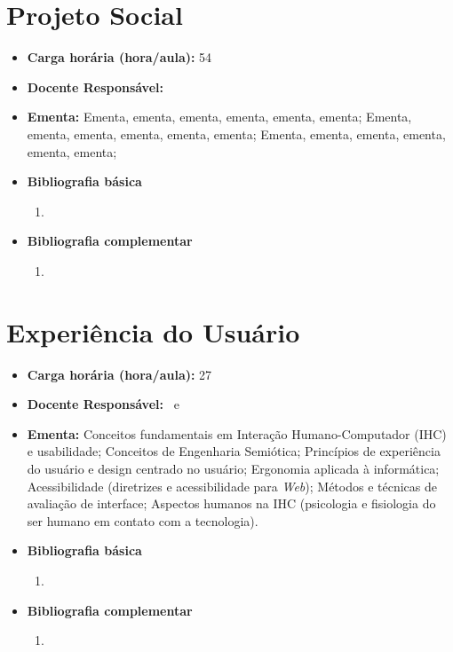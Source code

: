 \documentclass[11pt,fleqn]{book} %
\begin{document}

\newpage
\section{Projeto Social}\label{disc:projamb}

\begin{itemize}
	\item \textbf{Carga horária (hora/aula):} 54
	\item \textbf{Docente Responsável:}~
	\item \textbf{Ementa:} 
	Ementa, ementa, ementa, ementa, ementa, ementa;
	Ementa, ementa, ementa, ementa, ementa, ementa;
	Ementa, ementa, ementa, ementa, ementa, ementa;	
	\item \textbf{Bibliografia básica}
	\begin{enumerate}
		\item 
	\end{enumerate}
	\item \textbf{Bibliografia complementar}
	\begin{enumerate}
		\item 	
	\end{enumerate}	
\end{itemize}

\newpage
\section{Experiência do Usuário}\label{disc:expuser}

\begin{itemize}
	\item \textbf{Carga horária (hora/aula):} 27
	\item \textbf{Docente Responsável:}~ e ~
	\item \textbf{Ementa:} 
	Conceitos fundamentais em Interação Humano-Computador (IHC) e usabilidade;
	Conceitos de Engenharia Semiótica;
	Princípios de experiência do usuário e design centrado no usuário;
	Ergonomia aplicada à informática;
	Acessibilidade (diretrizes e acessibilidade para \textit{Web});
	Métodos e técnicas de avaliação de interface;
	Aspectos humanos na IHC (psicologia e fisiologia do ser humano em contato com a tecnologia).
	\item \textbf{Bibliografia básica}
	\begin{enumerate}
		\item ~\cite{Peirce1977}
	\end{enumerate}
	\item \textbf{Bibliografia complementar}
	\begin{enumerate}
		\item ~\cite{moreira1999teorias}
	\end{enumerate} 
\end{itemize}
\end{document}
